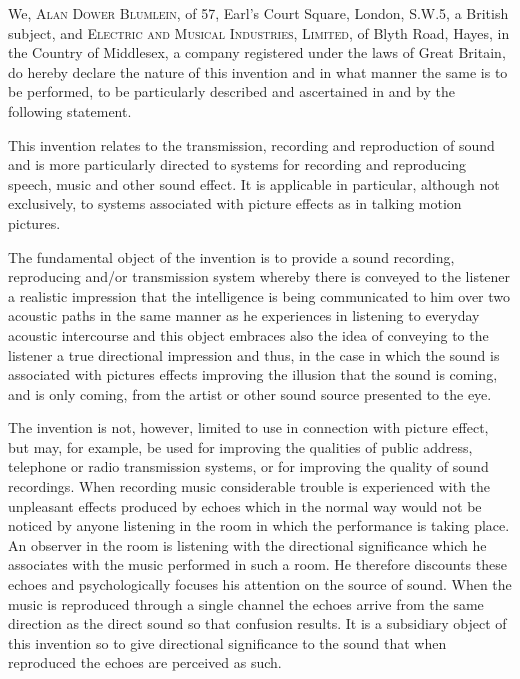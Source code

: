 \documentclass[11pt]{article}
\begin{document}
\begin{multicols*}{2}
\setlength{\parskip}{0pt}

We,  \textsc{Alan Dower Blumlein}, of 57, Earl’s Court Square, London, S.W.5, a British subject, and \textsc{Electric and Musical Industries, Limited}, of Blyth Road, Hayes, in the Country of Middlesex, a company registered under the laws of Great Britain, do hereby declare the nature of this invention and in what manner the same is to be performed, to be particularly described and ascertained in and by the following statement.

This invention relates to the transmission, recording and reproduction of sound and is more particularly directed to systems for recording and reproducing speech, music and other sound effect. It is applicable in particular, although not exclusively, to systems associated with picture effects as in talking motion pictures.
	
The fundamental object of the invention is to provide a sound recording, reproducing and/or transmission system whereby there is conveyed to the listener a realistic impression that the intelligence is being communicated to him over two acoustic paths in the same manner as he experiences in listening to everyday acoustic intercourse and this object embraces also the idea of conveying to the listener a true directional impression and thus, in the case in which the sound is associated with pictures effects improving the illusion that the sound is coming, and is only coming, from the artist or other sound source presented to the eye.

The invention is not, however, limited to use in connection with picture effect, but may, for example, be used for improving the qualities of public address, telephone or radio transmission systems, or for improving the quality of sound recordings. When recording music considerable trouble is experienced with the unpleasant effects produced by echoes which in the normal way would not be noticed by anyone listening in the room in which the performance is taking place. An observer in the room is listening with the directional significance which he associates with the music performed in such a room. He therefore discounts these echoes and psychologically focuses his attention on the source of sound. When the music is reproduced through a single channel the echoes arrive from the same direction as the direct sound so that confusion results. It is a subsidiary object of this invention so to give directional significance to the sound that when reproduced the echoes are perceived as such.


\end{multicols*}
\end{document}
